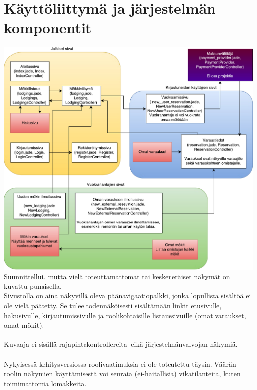 \chapter{Käyttöliittymä ja järjestelmän komponentit}

\includegraphics[width = 14cm]{./diagrams/view_architecture.pdf}
\noindent
Suunnittellut, mutta vielä toteuttamattomat tai keskeneräiset näkymät on kuvattu punaisella.\\
Sivustolla on aina näkyvillä oleva päänavigaatiopalkki, jonka lopullista sisältöä ei ole vielä päätetty. Se tulee todennäköisesti sisältämään linkit etusivulle, hakusivulle, kirjautumissivulle ja roolikohtaisille listaussivuille (omat varaukset, omat mökit).\\\\
Kuvaaja ei sisällä rajapintakontrollereita, eikä järjestelmänvalvojan näkymiä.\\\\
Nykyisessä kehitysversiossa roolivaatimuksia ei ole toteutettu täysin. Väärän roolin näkymien käyttämisestä voi seurata (ei-haitallisia) vikatilanteita, kuten toimimattomia lomakkeita.